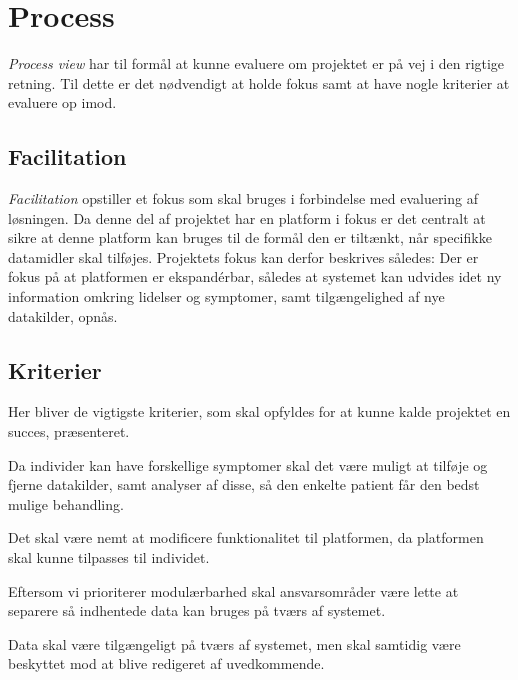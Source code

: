 \section{Process}\label{sec:process}
\emph{Process view} har til formål at kunne evaluere om projektet er på vej i den rigtige retning. 
Til dette er det nødvendigt at holde fokus samt at have nogle kriterier at evaluere op imod.

\subsection{Facilitation}
\emph{Facilitation} opstiller et fokus som skal bruges i forbindelse med evaluering af løsningen.
Da denne del af projektet har en platform i fokus er det centralt at sikre at denne platform kan bruges til de formål den er tiltænkt, når specifikke datamidler skal tilføjes.
Projektets fokus kan derfor beskrives således:
Der er fokus på at platformen er ekspandérbar, således at systemet kan udvides idet ny information omkring lidelser og symptomer, samt tilgængelighed af nye datakilder, opnås.

\subsection{Kriterier}\label{firstsubseckriterier}
Her bliver de vigtigste kriterier, som skal opfyldes for at kunne kalde projektet en succes, præsenteret.

\begin{description}[style=nextline]
	\item[Modulær] 
	Da individer kan have forskellige symptomer skal det være muligt at tilføje og fjerne datakilder, samt analyser af disse, så den enkelte patient får den bedst mulige behandling.
	\item[Fleksibel]
	Det skal være nemt at modificere funktionalitet til platformen, da platformen skal kunne tilpasses til individet.
	\item[Kombinerbar] Eftersom vi prioriterer modulærbarhed skal ansvarsområder være lette at separere så indhentede data kan bruges på tværs af systemet.
	\item[Kommunikativ] Data skal være tilgængeligt på tværs af systemet, men skal samtidig være beskyttet mod at blive redigeret af uvedkommende.
\end{description}